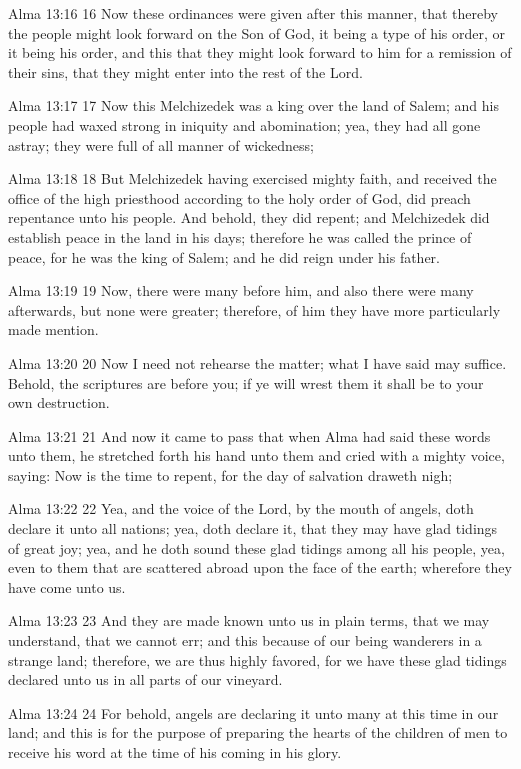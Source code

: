Alma 13:16
 16 Now these ordinances were given after this manner, that
thereby the people might look forward on the Son of God, it being
a type of his order, or it being his order, and this that they
might look forward to him for a remission of their sins, that
they might enter into the rest of the Lord.

Alma 13:17
 17 Now this Melchizedek was a king over the land of Salem; and
his people had waxed strong in iniquity and abomination; yea,
they had all gone astray; they were full of all manner of
wickedness;

Alma 13:18
 18 But Melchizedek having exercised mighty faith, and received
the office of the high priesthood according to the holy order of
God, did preach repentance unto his people. And behold, they did
repent; and Melchizedek did establish peace in the land in his
days; therefore he was called the prince of peace, for he was the
king of Salem; and he did reign under his father.

Alma 13:19
 19 Now, there were many before him, and also there were many
afterwards, but none were greater; therefore, of him they have
more particularly made mention.

Alma 13:20
 20 Now I need not rehearse the matter; what I have said may
suffice. Behold, the scriptures are before you; if ye will wrest
them it shall be to your own destruction.

Alma 13:21
 21 And now it came to pass that when Alma had said these words
unto them, he stretched forth his hand unto them and cried with a
mighty voice, saying: Now is the time to repent, for the day of
salvation draweth nigh;

Alma 13:22
 22 Yea, and the voice of the Lord, by the mouth of angels, doth
declare it unto all nations; yea, doth declare it, that they may
have glad tidings of great joy; yea, and he doth sound these glad
tidings among all his people, yea, even to them that are
scattered abroad upon the face of the earth; wherefore they have
come unto us.

Alma 13:23
 23 And they are made known unto us in plain terms, that we may
understand, that we cannot err; and this because of our being
wanderers in a strange land; therefore, we are thus highly
favored, for we have these glad tidings declared unto us in all
parts of our vineyard.

Alma 13:24
 24 For behold, angels are declaring it unto many at this time in
our land; and this is for the purpose of preparing the hearts of
the children of men to receive his word at the time of his coming
in his glory.

